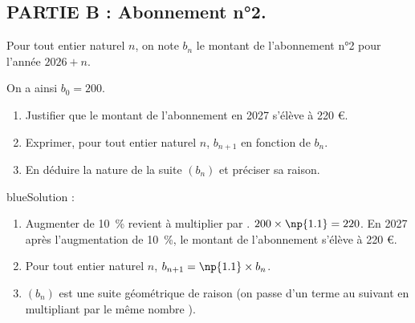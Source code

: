 \bigskip

\subsection*{PARTIE B : Abonnement n°2.}

Pour tout entier naturel $n$, on note $b_n$ le montant de l'abonnement n°2 pour l'année $2026+n$.

On a ainsi $b_0=200$.
\begin{enumerate}
\item Justifier que le montant de l'abonnement en 2027 s'élève à 220 \euro{}.
\item Exprimer, pour tout entier naturel $n$, $b_{n+1}$ en fonction de $b_n$.
\item En déduire la nature de la suite $(b_n)$ et préciser sa raison.
\end{enumerate}

\begin{color}{blue}Solution :\par
\begin{enumerate}
\item Augmenter de 10~\% revient à multiplier par . $200\times \np{1.1} = 220$. En 2027 après l'augmentation de 10~\%, le montant de l'abonnement s'élève à 220 \euro{}.
\item Pour tout entier naturel $n$, $b_{n+1} = \np{1.1}\times b_n$.
\item $(b_n)$ est une suite géométrique de raison  (on passe d'un terme au suivant en multipliant par le même nombre ).
\end{enumerate}
\end{color}

\bigskip

